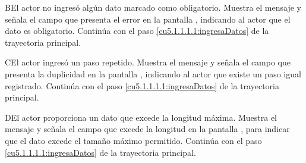  \begin{UCtrayectoriaA}{B}{El actor no ingresó algún dato marcado como obligatorio.}
    \UCpaso[\UCsist] Muestra el mensaje  y señala el campo que presenta el error en la pantalla 
	    , indicando al actor que el dato es obligatorio.
    \UCpaso[] Continúa con el paso \ref{cu5.1.1.1.1:ingresaDatos} de la trayectoria principal.
 \end{UCtrayectoriaA}
 \begin{UCtrayectoriaA}{C}{El actor ingresó un paso repetido.}
    \UCpaso[\UCsist] Muestra el mensaje  y señala el campo que presenta la duplicidad en la pantalla 
	    , indicando al actor que existe un paso igual registrado.
    \UCpaso[] Continúa con el paso \ref{cu5.1.1.1.1:ingresaDatos} de la trayectoria principal.
 \end{UCtrayectoriaA}
 \begin{UCtrayectoriaA}{D}{El actor proporciona un dato que excede la longitud máxima.}
    \UCpaso[\UCsist] Muestra el mensaje  y señala el campo que excede la 
    longitud en la pantalla , para indicar que el dato excede el tamaño máximo permitido.
    \UCpaso[] Continúa con el paso \ref{cu5.1.1.1.1:ingresaDatos} de la trayectoria principal.
 \end{UCtrayectoriaA}

  